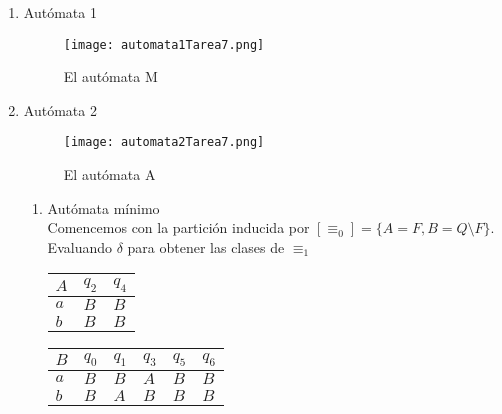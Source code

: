 \documentclass{article}
\begin{document}
    	\begin{enumerate}
    		\item {
    			Autómata 1
    			\begin{figure} [H]
    				\centering
    				\texttt{[image: automata1Tarea7.png]}
    				\caption{El autómata M}
    			\end{figure}
				}
    	
    	\item {
    		Autómata 2
    		\begin{figure} [H]
    			\centering
    			\texttt{[image: automata2Tarea7.png]}
    			\caption{El autómata A}
    		\end{figure}
    
            \begin{enumerate}
                \item Autómata mínimo\\
                Comencemos con la partición inducida por $[\equiv_{0}] = 
                \{A = F, B = Q \setminus F\}$.\\
                Evaluando $\delta$ para obtener las clases de $\equiv_{1}$
                
                    \begin{table}[H]
                        \centering
                        \begin{tabular}{|l|l|l|}
                            \hline
                            $A$ & $q_{2}$ & $q_4$ \\ \hline
                            $a$      & $B$     & $B$   \\ \hline
                            $b$      & $B$     & $B$   \\ \hline
                        \end{tabular}
                        \quad
                        \begin{tabular}{|l|l|l|l|l|l|}
                            \hline
                            $B$ & $q_{0}$ & $q_{1}$ & $q_{3}$ & $q_{5}$ & $q_{6}$ \\ \hline
                            $a$      & $B$     & $B$     & $A$     & $B$     & $B$     \\ \hline
                            $b$      & $B$     & $A$     & $B$     & $B$     & $B$     \\ \hline
                        \end{tabular}
                    \end{table}


\end{enumerate}}
\end{enumerate}
\end{document}
